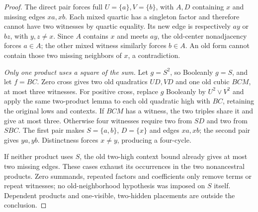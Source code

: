\documentclass[11pt]{article}
\theoremstyle{definition}
\theoremstyle{remark}
\begin{document}
\begin{proof}
The direct pair forces full $U=\{a\},V=\{b\}$, with $A,D$ containing $x$ and missing edges $xa,xb$. Each mixed quartic has a singleton factor and therefore cannot have two witnesses by quartic equality. Its new edge is respectively $ay$ or $bz$, with $y,z\ne x$. Since $A$ contains $x$ and meets $ay$, the old-center nonadjacency forces $a\in A$; the other mixed witness similarly forces $b\in A$. An old form cannot contain those two missing neighbors of $x$, a contradiction.

\emph{Only one product uses a square of the sum.} Let $g=S^2$, so Booleanly $g=S$, and let $f=BC$. Zero cross gives two old quadratics $UD,VD$ and one old cubic $BCM$, at most three witnesses. For positive cross, replace $g$ Booleanly by $U^2\vee V^2$ and apply the same two-product lemma to each old quadratic high with $BC$, retaining the original lows and contexts. If $BCM$ has a witness, the two triples share it and give at most three. Otherwise four witnesses require two from $SD$ and two from $SBC$. The first pair makes $S=\{a,b\}$, $D=\{x\}$ and edges $xa,xb$; the second pair gives $ya,yb$. Distinctness forces $x\ne y$, producing a four-cycle.

If neither product uses $S$, the old two-high context bound already gives at most two missing edges. These cases exhaust its occurrences in the two nonancestral products. Zero summands, repeated factors and coefficients only remove terms or repeat witnesses; no old-neighborhood hypothesis was imposed on $S$ itself. Dependent products and one-visible, two-hidden placements are outside the conclusion.
\end{proof}
\end{document}
